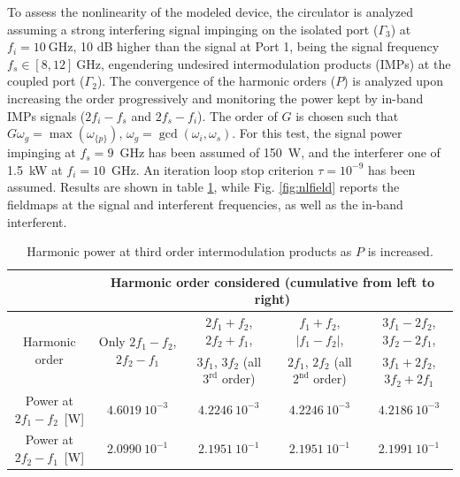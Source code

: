 To assess the nonlinearity of the modeled device, the circulator is analyzed assuming a strong interfering signal impinging on the isolated port ($\Gamma_3$) at $f_i = 10~\mathrm{GHz}$, 10 dB higher than the signal at Port 1, being the signal frequency $f_s \in [8,12]~\mathrm{GHz}$, engendering undesired intermodulation products (IMPs) at the coupled port ($\Gamma_2$). The convergence of the harmonic orders ($P$) is analyzed upon increasing the order progressively and monitoring the power kept by in-band IMPs signals ($2f_i-f_s$ and $2f_s-f_i$). The order of $G$ is chosen such that  $G\omega_g = \max(\omega_{\{p\}})$, $\omega_g = \gcd(\omega_i,\omega_s)$. For this test, the signal power impinging at $f_s = 9$~GHz has been assumed of 150~W, and the interferer one of 1.5~kW at $f_i = 10$~GHz. An iteration loop stop criterion $\tau = 10^{-9}$ has been assumed. Results are shown in table \ref{tab:power}, while Fig. \ref{fig:nlfield} reports the fieldmaps at the signal and interferent frequencies, as well as the in-band interferent. 
%
\begin{table}
\begin{center}
\begin{tabular}{|c|c|c|c|c|}
\hline 
& \multicolumn{4}{c|}{Harmonic order considered (cumulative from left to right)} \\ \hline
\multirow{2}{*}{Harmonic order} & \multirow{2}{*}{ Only $2f_1-f_2$, $2f_2-f_1$} & $2f_1+f_2$, $2f_2+f_1$, &	$f_1+f_2$, $|f_1-f_2|$, & $3f_1-2f_2$, $3f_2-2f_1$,\\
& & $3f_1$, $3f_2$ (all $3^\mathrm{rd}$ order) & $2f_1$, $2f_2$ (all $2^\mathrm{nd}$ order) &  $3f_1+2f_2$, $3f_2+2f_1$\\ \hline \hline
Power at $2f_1-f_2$~[W]& $4.6019~10^{-3}$ & $4.2246~10^{-3}$ & $4.2246~10^{-3}$ & $4.2186~10^{-3}$\\ \hline
Power at $2f_2-f_1$~[W]& $2.0990~10^{-1}$ & $2.1951~10^{-1}$ & $2.1951~10^{-1}$ & $2.1991~10^{-1}$\\ \hline
\end{tabular}
\end{center}
\caption{Harmonic power at third order intermodulation products as $P$ is increased.}
\label{tab:power}
\end{table} 
%
\clearpage

